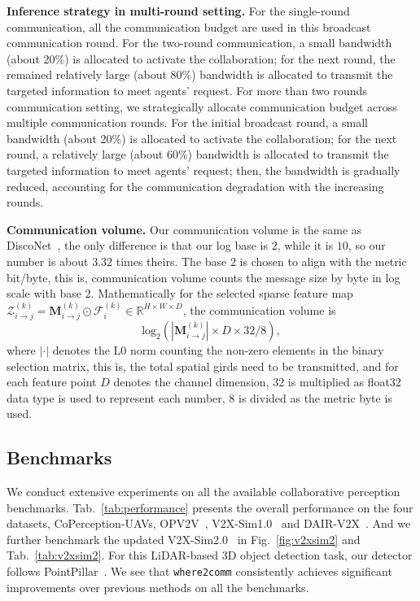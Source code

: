 \textbf{Inference strategy in multi-round setting.} For the single-round communication, all the communication budget are used in this broadcast communication round. For the two-round communication, a small bandwidth (about 20\%) is allocated to activate the collaboration; for the next round, the remained relatively large (about 80\%) bandwidth is allocated to transmit the targeted information to meet agents' request. For more than two rounds communication  setting, we strategically allocate communication budget across multiple communication rounds. For the initial broadcast round, a small bandwidth (about 20\%) is allocated to activate the collaboration; for the next round, a relatively large (about 60\%) bandwidth is allocated to transmit the targeted information to meet agents' request; then, the bandwidth is gradually reduced, accounting for the communication degradation with the increasing rounds. 


\textbf{Communication volume.} Our communication volume is the same as DiscoNet~\cite{disconet}, the only difference is that our log base is $2$, while it is $10$, so our number is about $3.32$ times theirs. The base $2$ is chosen to align with the metric bit/byte, this is, communication volume counts the message size by byte in log scale with base $2$. Mathematically for the selected sparse feature map
$
    \mathcal{Z}_{i\rightarrow j}^{(k)}=\mathbf{M}_{i\rightarrow j}^{(k)}\odot \mathcal{F}_i^{(k)} \in \mathbb{R}^{H\times W \times D}
$, the communication volume is
\begin{equation}
    \text{log}_2\left(|\mathbf{M}_{i\rightarrow j}^{(k)}| \times D \times 32 / 8\right)\label{comm},
\end{equation}
where $|\cdot|$ denotes the L0 norm counting the non-zero elements in the binary selection matrix, this is, the total spatial girds need to be transmitted, and for each feature point $D$ denotes the channel dimension, $32$ is multiplied as float32 data type is used to represent each number, $8$ is divided as the metric byte is used. 



\subsection{Benchmarks}
We conduct extensive experiments on all the available collaborative perception benchmarks. Tab.~\ref{tab:performance} presents the overall performance on the four datasets, CoPerception-UAVs, OPV2V~\cite{OPV2V}, V2X-Sim1.0~\cite{disconet} and DAIR-V2X~\cite{dair}. And we further benchmark the updated V2X-Sim2.0~\cite{V2XSim} in Fig.~\ref{fig:v2xsim2} and Tab.~\ref{tab:v2xsim2}. For this LiDAR-based 3D object detection task, our detector follows PointPillar~\cite{PointPillar}. We see that \texttt{where2comm} consistently achieves significant improvements over previous methods on all the benchmarks.

